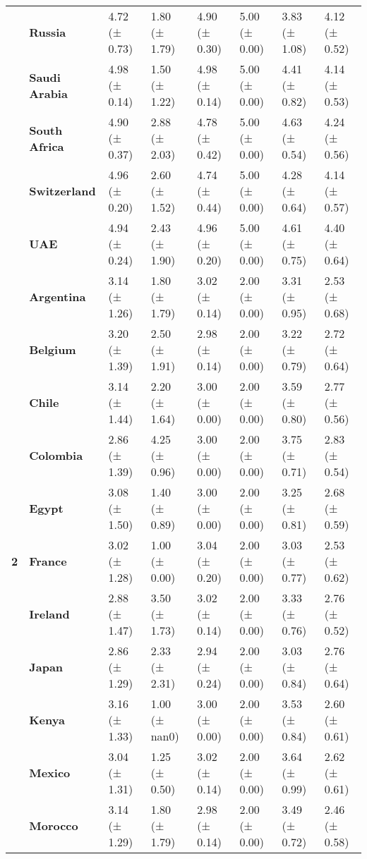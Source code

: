 \begin{tabular}{llllllll}
\textbf{} & \textbf{Russia} & 4.72 (± 0.73) & 1.80 (± 1.79) & 4.90 (± 0.30) & 5.00 (± 0.00) & 3.83 (± 1.08) & 4.12 (± 0.52) \\
\textbf{} & \textbf{Saudi Arabia} & 4.98 (± 0.14) & 1.50 (± 1.22) & 4.98 (± 0.14) & 5.00 (± 0.00) & 4.41 (± 0.82) & 4.14 (± 0.53) \\
\textbf{} & \textbf{South Africa} & 4.90 (± 0.37) & 2.88 (± 2.03) & 4.78 (± 0.42) & 5.00 (± 0.00) & 4.63 (± 0.54) & 4.24 (± 0.56) \\
\textbf{} & \textbf{Switzerland} & 4.96 (± 0.20) & 2.60 (± 1.52) & 4.74 (± 0.44) & 5.00 (± 0.00) & 4.28 (± 0.64) & 4.14 (± 0.57) \\
\textbf{} & \textbf{UAE} & 4.94 (± 0.24) & 2.43 (± 1.90) & 4.96 (± 0.20) & 5.00 (± 0.00) & 4.61 (± 0.75) & 4.40 (± 0.64) \\
\cline{1-8}
\multirow[t]{19}{*}{\textbf{2}} & \textbf{Argentina} & 3.14 (± 1.26) & 1.80 (± 1.79) & 3.02 (± 0.14) & 2.00 (± 0.00) & 3.31 (± 0.95) & 2.53 (± 0.68) \\
\textbf{} & \textbf{Belgium} & 3.20 (± 1.39) & 2.50 (± 1.91) & 2.98 (± 0.14) & 2.00 (± 0.00) & 3.22 (± 0.79) & 2.72 (± 0.64) \\
\textbf{} & \textbf{Chile} & 3.14 (± 1.44) & 2.20 (± 1.64) & 3.00 (± 0.00) & 2.00 (± 0.00) & 3.59 (± 0.80) & 2.77 (± 0.56) \\
\textbf{} & \textbf{Colombia} & 2.86 (± 1.39) & 4.25 (± 0.96) & 3.00 (± 0.00) & 2.00 (± 0.00) & 3.75 (± 0.71) & 2.83 (± 0.54) \\
\textbf{} & \textbf{Egypt} & 3.08 (± 1.50) & 1.40 (± 0.89) & 3.00 (± 0.00) & 2.00 (± 0.00) & 3.25 (± 0.81) & 2.68 (± 0.59) \\
\textbf{} & \textbf{France} & 3.02 (± 1.28) & 1.00 (± 0.00) & 3.04 (± 0.20) & 2.00 (± 0.00) & 3.03 (± 0.77) & 2.53 (± 0.62) \\
\textbf{} & \textbf{Ireland} & 2.88 (± 1.47) & 3.50 (± 1.73) & 3.02 (± 0.14) & 2.00 (± 0.00) & 3.33 (± 0.76) & 2.76 (± 0.52) \\
\textbf{} & \textbf{Japan} & 2.86 (± 1.29) & 2.33 (± 2.31) & 2.94 (± 0.24) & 2.00 (± 0.00) & 3.03 (± 0.84) & 2.76 (± 0.64) \\
\textbf{} & \textbf{Kenya} & 3.16 (± 1.33) & 1.00 (± nan0) & 3.00 (± 0.00) & 2.00 (± 0.00) & 3.53 (± 0.84) & 2.60 (± 0.61) \\
\textbf{} & \textbf{Mexico} & 3.04 (± 1.31) & 1.25 (± 0.50) & 3.02 (± 0.14) & 2.00 (± 0.00) & 3.64 (± 0.99) & 2.62 (± 0.61) \\
\textbf{} & \textbf{Morocco} & 3.14 (± 1.29) & 1.80 (± 1.79) & 2.98 (± 0.14) & 2.00 (± 0.00) & 3.49 (± 0.72) & 2.46 (± 0.58) \\

\end{tabular}
